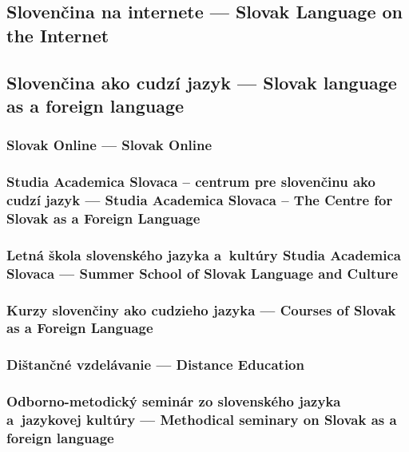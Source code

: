 \documentclass[paper=a4]{scrartcl}
\newcommand{\wpsk}[1]{\ParallelLText{\begin{slovak}\setlength\parindent{1em}\frenchspacing#1\end{slovak}}}
\newcommand{\wpen}[1]{\ParallelRText{\begin{english}\setlength\parindent{0pt}\nonfrenchspacing#1\end{english}}}
\begin{document}
\begin{Parallel}[c]{70mm}{70mm}
\subsection{Slovenčina na internete --- Slovak Language on the Internet}
\wpsk{}
\wpen{}
\ParallelPar

\subsection{Slovenčina ako cudzí jazyk --- Slovak language as a foreign language}
\subsubsection{Slovak Online --- Slovak Online}
\wpsk{}
\wpen{}
\ParallelPar

\subsubsection{Studia Academica Slovaca – centrum pre slovenčinu ako cudzí jazyk --- Studia Academica Slovaca – The Centre for Slovak as a Foreign Language}
\wpsk{}
\wpen{}
\ParallelPar

\subsubsection{Letná škola slovenského jazyka a kultúry Studia Academica Slovaca --- Summer School of Slovak Language and Culture}
\wpsk{}
\wpen{}
\ParallelPar

\subsubsection{Kurzy slovenčiny ako cudzieho jazyka --- Courses of Slovak as a Foreign Language}
\wpsk{}
\wpen{}
\ParallelPar

\subsubsection{Dištančné vzdelávanie --- Distance Education}
\wpsk{}
\wpen{}
\ParallelPar

\subsubsection{Odborno-metodický seminár zo slovenského jazyka a jazykovej kultúry --- Methodical seminary on Slovak as a foreign language}
\wpsk{}
\wpen{}
\ParallelPar


\end{Parallel}
\end{document}
